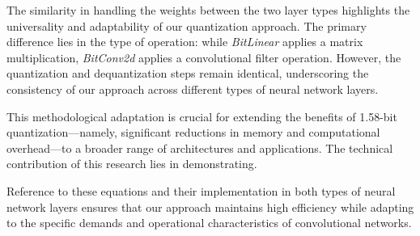 \documentclass{article}
\begin{document}
The similarity in handling the weights between the two layer types highlights the universality and adaptability of our quantization approach. The primary difference lies in the type of operation: while \textit{BitLinear} applies a matrix multiplication, \textit{BitConv2d} applies a convolutional filter operation. However, the quantization and dequantization steps remain identical, underscoring the consistency of our approach across different types of neural network layers.

This methodological adaptation is crucial for extending the benefits of 1.58-bit quantization—namely, significant reductions in memory and computational overhead—to a broader range of architectures and applications. The technical contribution of this research lies in demonstrating.

Reference to these equations and their implementation in both types of neural network layers ensures that our approach maintains high efficiency while adapting to the specific demands and operational characteristics of convolutional networks.




\end{document}
